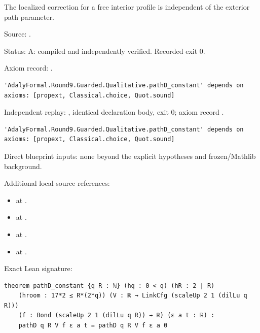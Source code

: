 \begin{theorem}[bp-104]
\label{bp-104}
\uses{}
\leanok
The localized correction for a free interior profile is independent of the exterior path parameter.

\par Source: \texttt{}.
\par Status: A: compiled and independently verified. Recorded exit 0.
\par Axiom record: \texttt{}.
\begin{verbatim}
'AdalyFormal.Round9.Guarded.Qualitative.pathD_constant' depends on axioms: [propext, Classical.choice, Quot.sound]
\end{verbatim}
\par Independent replay: \texttt{}, identical declaration body, exit 0; axiom record \texttt{}.
\begin{verbatim}
'AdalyFormal.Round9.Guarded.Qualitative.pathD_constant' depends on axioms: [propext, Classical.choice, Quot.sound]
\end{verbatim}
\par Direct blueprint inputs: none beyond the explicit hypotheses and frozen/Mathlib background.
\par Additional local source references:
\begin{itemize}
\item \texttt{} at \texttt{}.
\item \texttt{} at \texttt{}.
\item \texttt{} at \texttt{}.
\item \texttt{} at \texttt{}.
\end{itemize}
\par Exact Lean signature:
\begin{verbatim}
theorem pathD_constant {q R : ℕ} (hq : 0 < q) (hR : 2 ∣ R)
    (hroom : 17*2 ≤ R*(2*q)) (V : ℝ → LinkCfg (scaleUp 2 1 (dilLu q R)))
    (f : Bond (scaleUp 2 1 (dilLu q R)) → ℝ) (ε a t : ℝ) :
    pathD q R V f ε a t = pathD q R V f ε a 0
\end{verbatim}
\end{theorem}

